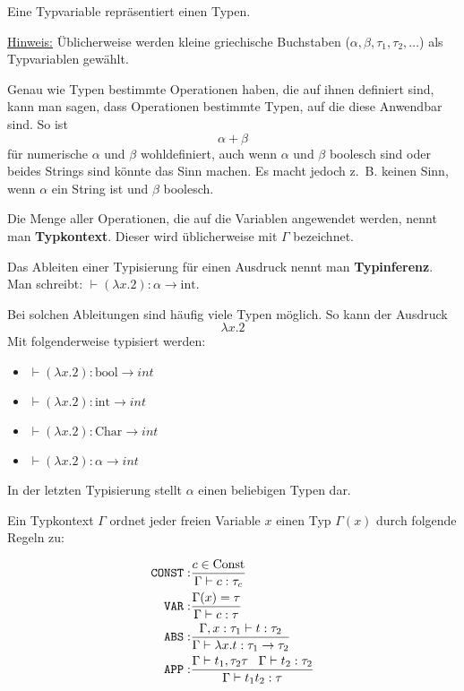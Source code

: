 \begin{definition}[Typvariable]%
	Eine Typvariable repräsentiert einen Typen.
\end{definition}

\underline{Hinweis:} Üblicherweise werden kleine griechische Buchstaben ($\alpha, \beta, \tau_1, \tau_2, \dots$) als Typvariablen gewählt.

Genau wie Typen bestimmte Operationen haben, die auf ihnen definiert sind, 
kann man sagen, dass Operationen bestimmte Typen, auf die diese Anwendbar sind. So ist
\[\alpha+\beta\]
für numerische $\alpha$ und $\beta$ wohldefiniert, auch wenn $\alpha$ und $\beta$ boolesch sind
oder beides Strings sind könnte das Sinn machen. Es macht jedoch z.~B. keinen Sinn,
wenn $\alpha$ ein String ist und $\beta$ boolesch.

Die Menge aller Operationen, die auf die Variablen angewendet werden, nennt man
\textbf{Typkontext}. Dieser wird üblicherweise mit $\Gamma$
bezeichnet.

Das Ableiten einer Typisierung für einen Ausdruck nennt man \textbf{Typinferenz}.
Man schreibt: $\vdash(\lambda x.2): \alpha \rightarrow \text{int}$.

Bei solchen Ableitungen sind häufig viele Typen möglich. So kann der Ausdruck
\[\lambda x.2\]
Mit folgenderweise typisiert werden:
\begin{itemize}
	\item $\vdash(\lambda x.2): \text{bool} \rightarrow int$
	\item $\vdash(\lambda x.2): \text{int} \rightarrow int$
	\item $\vdash(\lambda x.2): \text{Char} \rightarrow int$
	\item $\vdash(\lambda x.2): \alpha \rightarrow int$
\end{itemize}

In der letzten Typisierung stellt $\alpha$ einen beliebigen Typen dar.

Ein Typkontext $\Gamma$ ordnet jeder freien Variable $x$ einen Typ $\Gamma(x)$
durch folgende Regeln zu:

\begin{align*}
	\text{\texttt{CONST}}:&\frac{c \in \text{Const}}{\Gamma \vdash c: \tau_c}\\
	\text{\texttt{VAR}}:  &\frac{\Gamma(x) = \tau}{\Gamma \vdash c: \tau}\\
	\text{\texttt{ABS}}:  &\frac{\Gamma, x: \tau_1 \vdash t: \tau_2}{\Gamma \vdash \lambda x. t: \tau_1 \rightarrow \tau_2}\\
	\text{\texttt{APP}}:  &\frac{\Gamma \vdash t_1, \tau_2 \tau\;\;\; \Gamma \vdash t_2: \tau_2}{\Gamma \vdash t_1 t_2: \tau}
\end{align*}

